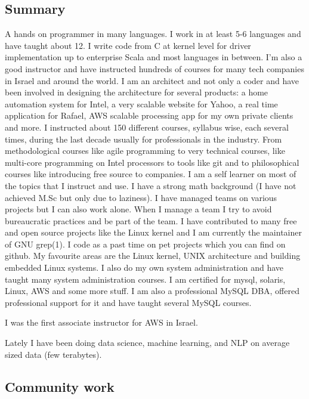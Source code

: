 \documentclass[
]{article}
\begin{document}
\subsection{Summary}\label{summary}

A hands on programmer in many languages. I work in at least 5-6
languages and have taught about 12. I write code from C at kernel level
for driver implementation up to enterprise Scala and most languages in
between. I'm also a good instructor and have instructed hundreds of
courses for many tech companies in Israel and around the world. I am an
architect and not only a coder and have been involved in designing the
architecture for several products: a home automation system for Intel, a
very scalable website for Yahoo, a real time application for Rafael, AWS
scalable processing app for my own private clients and more. I
instructed about 150 different courses, syllabus wise, each several
times, during the last decade usually for professionals in the industry.
From methodological courses like agile programming to very technical
courses, like multi-core programming on Intel processors to tools like
git and to philosophical courses like introducing free source to
companies. I am a self learner on most of the topics that I instruct and
use. I have a strong math background (I have not achieved M.Sc but only
due to laziness). I have managed teams on various projects but I can
also work alone. When I manage a team I try to avoid bureaucratic
practices and be part of the team. I have contributed to many free and
open source projects like the Linux kernel and I am currently the
maintainer of GNU grep(1). I code as a past time on pet projects which
you can find on github. My favourite areas are the Linux kernel, UNIX
architecture and building embedded Linux systems. I also do my own
system administration and have taught many system administration
courses. I am certified for mysql, solaris, Linux, AWS and some more
stuff. I am also a professional MySQL DBA, offered professional support
for it and have taught several MySQL courses.

I was the first associate instructor for AWS in Israel.

Lately I have been doing data science, machine learning, and NLP on
average sized data (few terabytes).

\subsection{Community work}\label{community-work}
\end{document}
